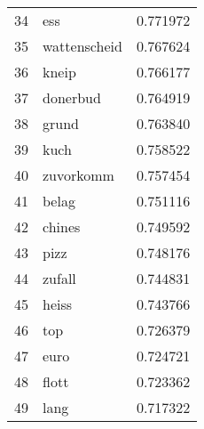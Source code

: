 \begin{tabular}{llr}
34 &           ess &  0.771972 \\
35 &  wattenscheid &  0.767624 \\
36 &         kneip &  0.766177 \\
37 &      donerbud &  0.764919 \\
38 &         grund &  0.763840 \\
39 &          kuch &  0.758522 \\
40 &     zuvorkomm &  0.757454 \\
41 &         belag &  0.751116 \\
42 &        chines &  0.749592 \\
43 &          pizz &  0.748176 \\
44 &        zufall &  0.744831 \\
45 &         heiss &  0.743766 \\
46 &           top &  0.726379 \\
47 &          euro &  0.724721 \\
48 &         flott &  0.723362 \\
49 &          lang &  0.717322 \\
\bottomrule
\end{tabular}
